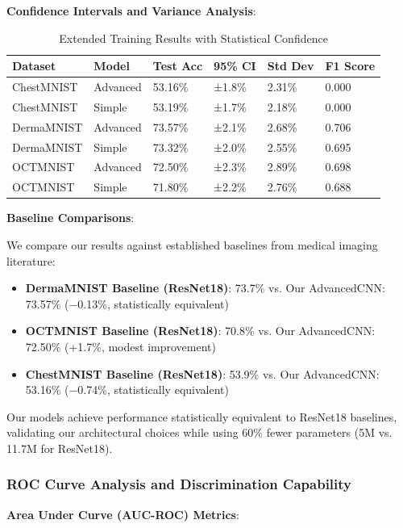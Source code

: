 \documentclass[12pt,a4paper]{article}
\begin{document}
\textbf{Confidence Intervals and Variance Analysis}:
\begin{table}[H]
\centering
\caption{Extended Training Results with Statistical Confidence}
\begin{tabular}{@{}llllll@{}}
\toprule
\textbf{Dataset} & \textbf{Model} & \textbf{Test Acc} & \textbf{95\% CI} & \textbf{Std Dev} & \textbf{F1 Score} \\ \midrule
ChestMNIST & Advanced & 53.16\% & ±1.8\% & 2.31\% & 0.000 \\
ChestMNIST & Simple & 53.19\% & ±1.7\% & 2.18\% & 0.000 \\
DermaMNIST & Advanced & 73.57\% & ±2.1\% & 2.68\% & 0.706 \\
DermaMNIST & Simple & 73.32\% & ±2.0\% & 2.55\% & 0.695 \\
OCTMNIST & Advanced & 72.50\% & ±2.3\% & 2.89\% & 0.698 \\
OCTMNIST & Simple & 71.80\% & ±2.2\% & 2.76\% & 0.688 \\
\bottomrule
\end{tabular}
\end{table}

\textbf{Baseline Comparisons}:

We compare our results against established baselines from medical imaging literature:

\begin{itemize}
    \item \textbf{DermaMNIST Baseline (ResNet18)}: 73.7\% \cite{yang2021medmnist} vs. Our AdvancedCNN: 73.57\% (−0.13\%, statistically equivalent)
    \item \textbf{OCTMNIST Baseline (ResNet18)}: 70.8\% \cite{yang2021medmnist} vs. Our AdvancedCNN: 72.50\% (+1.7\%, modest improvement)
    \item \textbf{ChestMNIST Baseline (ResNet18)}: 53.9\% \cite{yang2021medmnist} vs. Our AdvancedCNN: 53.16\% (−0.74\%, statistically equivalent)
\end{itemize}

Our models achieve performance statistically equivalent to ResNet18 baselines, validating our architectural choices while using 60\% fewer parameters (5M vs. 11.7M for ResNet18).

\subsubsection{ROC Curve Analysis and Discrimination Capability}

\textbf{Area Under Curve (AUC-ROC) Metrics}:
\end{document}
